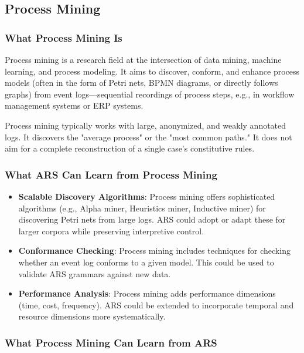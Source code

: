 \documentclass[12pt,a4paper]{article}
\begin{document}
\subsection{Process Mining}

\subsubsection{What Process Mining Is}

Process mining is a research field at the intersection of data mining, machine 
learning, and process modeling. It aims to discover, conform, and enhance 
process models (often in the form of Petri nets, BPMN diagrams, or directly 
follows graphs) from event logs—sequential recordings of process steps, e.g., 
in workflow management systems or ERP systems.

Process mining typically works with large, anonymized, and weakly annotated 
logs. It discovers the "average process" or the "most common paths." It does 
not aim for a complete reconstruction of a single case's constitutive rules.

\subsubsection{What ARS Can Learn from Process Mining}

\begin{itemize}
    \item \textbf{Scalable Discovery Algorithms}: Process mining offers 
    sophisticated algorithms (e.g., Alpha miner, Heuristics miner, Inductive 
    miner) for discovering Petri nets from large logs. ARS could adopt or 
    adapt these for larger corpora while preserving interpretive control.
    
    \item \textbf{Conformance Checking}: Process mining includes techniques 
    for checking whether an event log conforms to a given model. This could 
    be used to validate ARS grammars against new data.
    
    \item \textbf{Performance Analysis}: Process mining adds performance 
    dimensions (time, cost, frequency). ARS could be extended to incorporate 
    temporal and resource dimensions more systematically.
\end{itemize}

\subsubsection{What Process Mining Can Learn from ARS}
\end{document}
